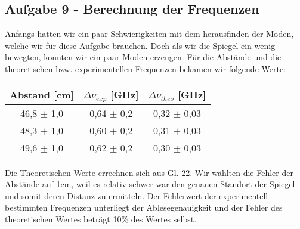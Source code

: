 \subsection{Aufgabe 9 - Berechnung der Frequenzen}

Anfangs hatten wir ein paar Schwierigkeiten mit dem herausfinden der Moden, welche wir für diese Aufgabe brauchen. Doch als wir die Spiegel ein wenig bewegten, konnten wir ein paar Moden erzeugen.
Für die Abstände und die theoretischen bzw. experimentellen Frequenzen bekamen wir folgende Werte:

\begin{center}
\begin{tabular}{c | c | c}
Abstand [cm] & $\Delta \nu_{exp}$ [GHz] & $\Delta \nu_{theo}$ [GHz]\\ \hline
46,8 $\pm$ 1,0 & 0,64 $\pm$ 0,2 & 0,32 $\pm$ 0,03\\ 
48,3 $\pm$ 1,0 & 0,60 $\pm$ 0,2 & 0,31 $\pm$ 0,03\\
49,6 $\pm$ 1,0 & 0,62 $\pm$ 0,2 & 0,30 $\pm$ 0,03\\
\end{tabular}
\end{center}

Die Theoretischen Werte errechnen sich aus Gl. 22. Wir wählten die Fehler der Abstände auf 1cm, weil es relativ schwer war den genauen Standort der Spiegel und somit deren Distanz zu ermitteln. Der Fehlerwert der experimentell bestimmten Frequenzen unterliegt der Ablesegenauigkeit und der Fehler des theoretischen Wertes beträgt 10$\%$ des Wertes selbst.